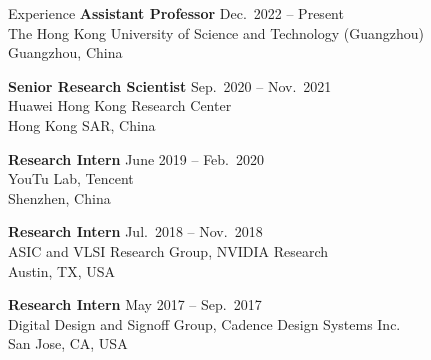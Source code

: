 
\begin{rSection}{Experience}
{\bf Assistant Professor}         \hfill { Dec.~2022 -- Present} \\
The Hong Kong University of Science and Technology (Guangzhou) \\
Guangzhou, China

{\bf Senior Research Scientist}         \hfill { Sep.~2020 -- Nov.~2021} \\
Huawei Hong Kong Research Center\\
Hong Kong SAR, China

{\bf Research Intern}         \hfill { June 2019 -- Feb.~2020} \\
YouTu Lab, Tencent\\
Shenzhen, China

{\bf Research Intern}               \hfill { Jul.~2018 -- Nov.~2018} \\
ASIC and VLSI Research Group, NVIDIA Research\\
Austin, TX, USA

{\bf Research Intern}               \hfill { May 2017 -- Sep.~2017} \\
Digital Design and Signoff Group, Cadence Design Systems Inc.\\
San Jose, CA, USA


\end{rSection}


